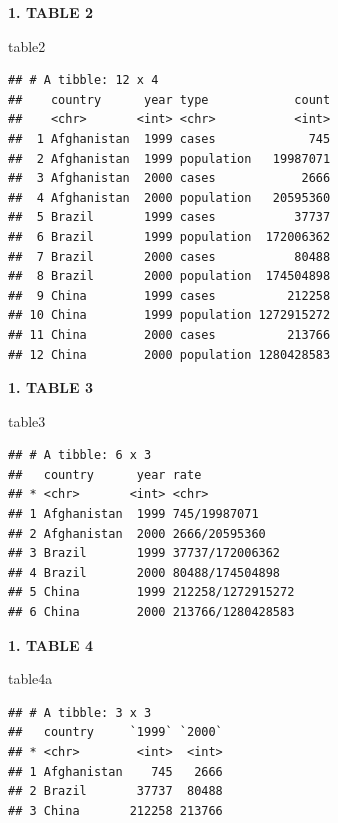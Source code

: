 \documentclass[]{article}
\newenvironment{Shaded}{\begin{snugshade}}{\end{snugshade}}
\newcommand{\NormalTok}[1]{#1}
\begin{document}
\textbf{1. TABLE 2}

\begin{Shaded}
\begin{Highlighting}[]
\NormalTok{table2}
\end{Highlighting}
\end{Shaded}

\begin{verbatim}
## # A tibble: 12 x 4
##    country      year type            count
##    <chr>       <int> <chr>           <int>
##  1 Afghanistan  1999 cases             745
##  2 Afghanistan  1999 population   19987071
##  3 Afghanistan  2000 cases            2666
##  4 Afghanistan  2000 population   20595360
##  5 Brazil       1999 cases           37737
##  6 Brazil       1999 population  172006362
##  7 Brazil       2000 cases           80488
##  8 Brazil       2000 population  174504898
##  9 China        1999 cases          212258
## 10 China        1999 population 1272915272
## 11 China        2000 cases          213766
## 12 China        2000 population 1280428583
\end{verbatim}

\textbf{1. TABLE 3}

\begin{Shaded}
\begin{Highlighting}[]
\NormalTok{table3}
\end{Highlighting}
\end{Shaded}

\begin{verbatim}
## # A tibble: 6 x 3
##   country      year rate             
## * <chr>       <int> <chr>            
## 1 Afghanistan  1999 745/19987071     
## 2 Afghanistan  2000 2666/20595360    
## 3 Brazil       1999 37737/172006362  
## 4 Brazil       2000 80488/174504898  
## 5 China        1999 212258/1272915272
## 6 China        2000 213766/1280428583
\end{verbatim}

\textbf{1. TABLE 4}

\begin{Shaded}
\begin{Highlighting}[]
\NormalTok{table4a}
\end{Highlighting}
\end{Shaded}

\begin{verbatim}
## # A tibble: 3 x 3
##   country     `1999` `2000`
## * <chr>        <int>  <int>
## 1 Afghanistan    745   2666
## 2 Brazil       37737  80488
## 3 China       212258 213766
\end{verbatim}
\end{document}
